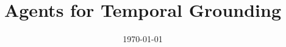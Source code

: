 \documentclass[11pt]{article}
\title{Agents for Temporal Grounding}
\author{}
\date{\today}
\begin{document}
\maketitle

\begin{abstract}

\end{abstract}











\appendix






\end{document}
